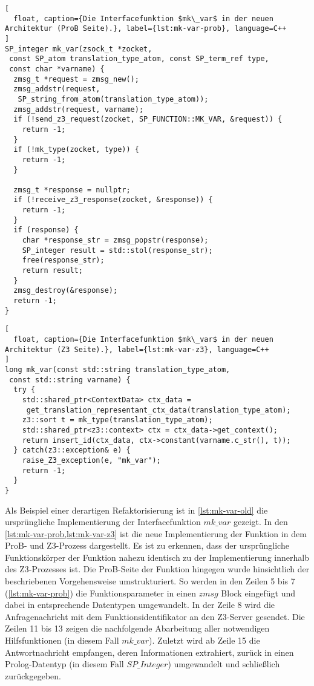 \begin{lstlisting}[
  float, caption={Die Interfacefunktion $mk\_var$ in der neuen Architektur (ProB Seite).}, label={lst:mk-var-prob}, language=C++
]
SP_integer mk_var(zsock_t *zocket,
 const SP_atom translation_type_atom, const SP_term_ref type,
 const char *varname) {
  zmsg_t *request = zmsg_new();
  zmsg_addstr(request,
   SP_string_from_atom(translation_type_atom));
  zmsg_addstr(request, varname);
  if (!send_z3_request(zocket, SP_FUNCTION::MK_VAR, &request)) {
    return -1;
  }
  if (!mk_type(zocket, type)) {
    return -1;
  }

  zmsg_t *response = nullptr;
  if (!receive_z3_response(zocket, &response)) {
    return -1;
  }
  if (response) {
    char *response_str = zmsg_popstr(response);
    SP_integer result = std::stol(response_str);
    free(response_str);
    return result;
  }
  zmsg_destroy(&response);
  return -1;
}
\end{lstlisting}

\begin{lstlisting}[
  float, caption={Die Interfacefunktion $mk\_var$ in der neuen Architektur (Z3 Seite).}, label={lst:mk-var-z3}, language=C++
]
long mk_var(const std::string translation_type_atom,
 const std::string varname) {
  try {
    std::shared_ptr<ContextData> ctx_data = 
     get_translation_representant_ctx_data(translation_type_atom);
    z3::sort t = mk_type(translation_type_atom);
    std::shared_ptr<z3::context> ctx = ctx_data->get_context();
    return insert_id(ctx_data, ctx->constant(varname.c_str(), t));
  } catch(z3::exception& e) {
    raise_Z3_exception(e, "mk_var");
    return -1;
  }
}
\end{lstlisting}


Als Beispiel einer derartigen Refaktorisierung ist in \cref{lst:mk-var-old} die ursprüngliche Implementierung der Interfacefunktion $mk\_var$ gezeigt.
In den \cref{lst:mk-var-prob,lst:mk-var-z3} ist die neue Implementierung der Funktion in dem ProB- und Z3-Prozess dargestellt.
Es ist zu erkennen, dass der ursprüngliche Funktionskörper der Funktion nahezu identisch zu der Implementierung innerhalb des Z3-Prozesses ist.
Die ProB-Seite der Funktion hingegen wurde hinsichtlich der beschriebenen Vorgehensweise umstrukturiert.
So werden in den Zeilen 5 bis 7 (\cref{lst:mk-var-prob}) die Funktionsparameter in einen $zmsg$ Block eingefügt und dabei in entsprechende Datentypen umgewandelt.
In der Zeile 8 wird die Anfragenachricht mit dem Funktionsidentifikator an den Z3-Server gesendet.
Die Zeilen 11 bis 13 zeigen die nachfolgende Abarbeitung aller notwendigen Hilfsfunktionen (in diesem Fall $mk\_var$).
Zuletzt wird ab Zeile 15 die Antwortnachricht empfangen, deren Informationen extrahiert, zurück in einen Prolog-Datentyp (in diesem Fall $SP\_Integer$) umgewandelt und schließlich zurückgegeben.

